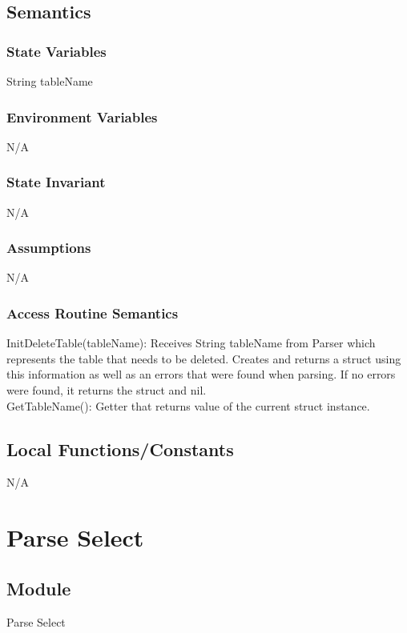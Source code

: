 \documentclass[12pt]{article}
\begin{document}
\subsection{Semantics}
\subsubsection{State Variables}
String tableName \\

\subsubsection{Environment Variables}
N/A

\subsubsection{State Invariant}
N/A

\subsubsection{Assumptions}
N/A

\subsubsection{Access Routine Semantics}
\noindent InitDeleteTable(tableName): Receives String tableName from Parser which represents the table that needs to be deleted. Creates and returns a struct using this information as well as an errors that were found when parsing. If no errors were found, it returns the struct and nil. \\

\noindent GetTableName(): Getter that returns value of the current struct instance. \\


\subsection{Local Functions/Constants}
N/A

\newpage

\section{Parse Select}

\subsection{Module}
Parse Select
\end{document}
